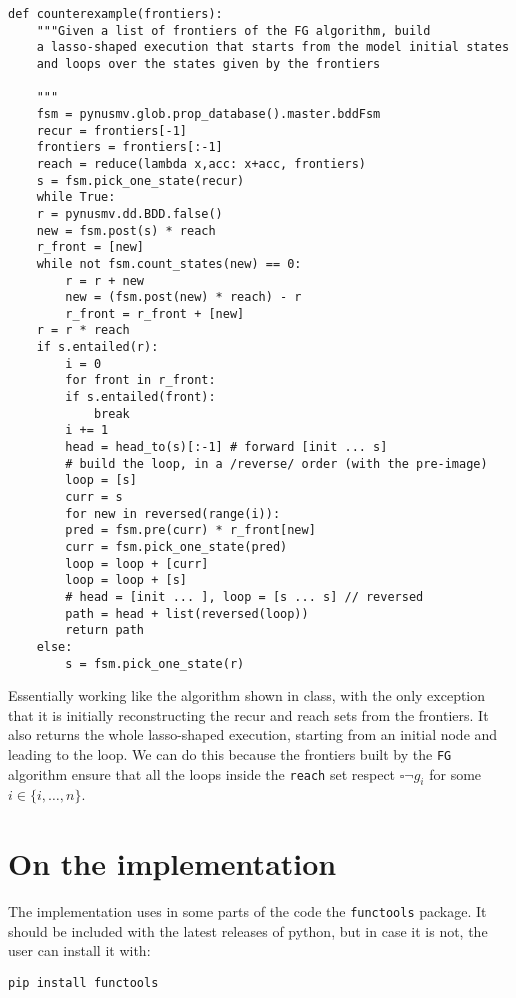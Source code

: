 \documentclass[10pt]{article}
\begin{document}
\begin{verbatim}
def counterexample(frontiers):
    """Given a list of frontiers of the FG algorithm, build
    a lasso-shaped execution that starts from the model initial states
    and loops over the states given by the frontiers

    """
    fsm = pynusmv.glob.prop_database().master.bddFsm
    recur = frontiers[-1]
    frontiers = frontiers[:-1]
    reach = reduce(lambda x,acc: x+acc, frontiers)
    s = fsm.pick_one_state(recur)
    while True:
	r = pynusmv.dd.BDD.false()
	new = fsm.post(s) * reach
	r_front = [new]
	while not fsm.count_states(new) == 0:
	    r = r + new
	    new = (fsm.post(new) * reach) - r
	    r_front = r_front + [new]
	r = r * reach
	if s.entailed(r):
	    i = 0
	    for front in r_front:
		if s.entailed(front):
		    break
		i += 1
	    head = head_to(s)[:-1] # forward [init ... s]
	    # build the loop, in a /reverse/ order (with the pre-image)
	    loop = [s]
	    curr = s
	    for new in reversed(range(i)):
		pred = fsm.pre(curr) * r_front[new]
		curr = fsm.pick_one_state(pred)
		loop = loop + [curr]
	    loop = loop + [s]
	    # head = [init ... ], loop = [s ... s] // reversed
	    path = head + list(reversed(loop))
	    return path
	else:
	    s = fsm.pick_one_state(r)
\end{verbatim}

Essentially working like the algorithm shown in class, with the only
exception that it is initially reconstructing the recur and reach
sets from the frontiers. It also returns the whole lasso-shaped
execution, starting from an initial node and leading to the loop. We
can do this because the frontiers built by the \texttt{FG} algorithm ensure
that all the loops inside the \texttt{reach} set respect \(\square \neg
  g_i\) for some \(i \in \{i,\dots,n\}\).

\section*{On the implementation}
\label{sec:orgc81274d}
The implementation uses in some parts of the code the \texttt{functools}
package. It should be included with the latest releases of python,
but in case it is not, the user can install it with:
\begin{verbatim}
pip install functools
\end{verbatim}
\end{document}
